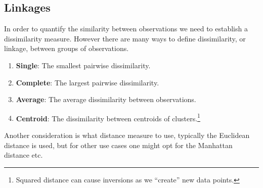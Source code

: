 \documentclass[aspectratio=169,10pt]{beamer}
\begin{document}
\subsection{Linkages}
\begin{frame}{\secname}{\subsecname}
  In order to quantify the similarity between observations we need to establish a dissimilarity measure.
  However there are many ways to define dissimilarity, or linkage, between groups of observations.

  \begin{enumerate}
    \item \textbf{Single}: The smallest pairwise dissimilarity.
    \item \textbf{Complete}: The largest pairwise dissimilarity.
    \item \textbf{Average}: The average dissimilarity between observations.
    \item \textbf{Centroid}: The dissimilarity between centroids of clusters.\footnote{Squared distance can cause inversions as we ``create'' new data points.}
  \end{enumerate}

  Another consideration is what distance measure to use, typically the Euclidean distance is used, but for other use cases one might opt for the Manhattan distance etc.
\end{frame}
\end{document}
